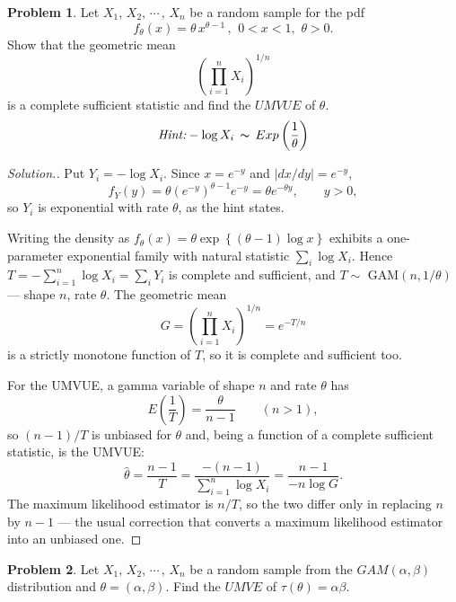 \documentclass[12pt,a4paper]{report}
\theoremstyle{definition}
\newtheorem{problemx}{Problem}[section]
\newenvironment{problem}{\begin{problemx}}{\end{problemx}}
\newenvironment{solution}
  {\renewcommand{\qedsymbol}{}\begin{proof}[\textit{Solution}.]}
  {\end{proof}}
\begin{document}
\begin{problem}
Let $X_1, \, X_2, \, \cdots\, , \, X_n$ be a random sample for the pdf \[f_{\theta}(x) = \theta\, x^{\theta - 1}\, , \,\  0 < x < 1, \, \, \theta > 0.\]
Show that the geometric mean \[\left(\prod^n_{i = 1} X_i \right)^{1/n}\] is a complete sufficient statistic and find the $UMVUE$ of $\theta$.
\[\textit{Hint:} - \log X_i \, \thicksim \, Exp\left(\frac{1}{\theta}\right)\]
\end{problem}

\begin{solution}
Put $Y_i = -\log X_i$. Since $x=e^{-y}$ and $\left|dx/dy\right| = e^{-y}$,
\[f_Y(y) = \theta\left(e^{-y}\right)^{\theta-1}e^{-y} = \theta e^{-\theta y},
\qquad y>0 ,\]
so $Y_i$ is exponential with rate $\theta$, as the hint states.

Writing the density as
$f_{\theta}(x) = \theta\exp\left\{(\theta-1)\log x\right\}$ exhibits a
one-parameter exponential family with natural statistic $\sum_i \log X_i$.
Hence $T = -\sum_{i=1}^{n}\log X_i = \sum_i Y_i$ is complete and sufficient, and
$T\sim$ GAM$(n,1/\theta)$ --- shape $n$, rate $\theta$. The geometric mean
\[G = \left(\prod_{i=1}^{n}X_i\right)^{1/n} = e^{-T/n}\]
is a strictly monotone function of $T$, so it is complete and sufficient too.

For the UMVUE, a gamma variable of shape $n$ and rate $\theta$ has
\[E\left(\frac{1}{T}\right) = \frac{\theta}{n-1}\qquad (n>1),\]
so $(n-1)/T$ is unbiased for $\theta$ and, being a function of a complete
sufficient statistic, is the UMVUE:
\[\widehat{\theta} = \frac{n-1}{T} = \frac{-(n-1)}{\sum_{i=1}^{n}\log X_i}
= \frac{n-1}{-n\log G}.\]
The maximum likelihood estimator is $n/T$, so the two differ only in replacing
$n$ by $n-1$ --- the usual correction that converts a maximum likelihood
estimator into an unbiased one.
\end{solution}

\begin{problem}
Let $X_1, \, X_2, \, \cdots\, , \, X_n$ be a random sample from the $GAM(\alpha, \beta)$ distribution and $\theta = (\alpha , \beta)$. Find the $UMVE$ of $\tau(\theta) = \alpha\beta$.
\end{problem}
\end{document}
